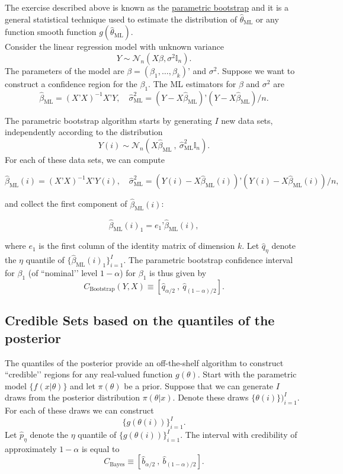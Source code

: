 \documentclass[11pt]{article} %
\begin{document}
The exercise described above is known as the \underline{parametric bootstrap} and it is a general statistical technique used to estimate the distribution of $\widehat{\theta}_{\textrm{ML}}$ or any function smooth function $g(\widehat{\theta}_{\textrm{ML}})$. \\

 Consider the linear regression model with unknown variance
\[ Y \sim \mathcal{N}_n (X\beta, \sigma^2 \mathbb{I}_n). \]
The parameters of the model are $\beta = (\beta_1, \ldots, \beta_{k})’$ and $\sigma^2$. Suppose we want to construct a confidence region for the $\beta_1$. The ML estimators for $\beta$ and $\sigma^2$ are
\[ \widehat{\beta}_{\textrm{ML}} = (X’X)^{-1}X’Y, \quad \widehat{\sigma}^2_{\textrm{ML}} = (Y-X \widehat{\beta}_{\textrm{ML}})’ (Y-X \widehat{\beta}_{\textrm{ML}})/n.  \]

\noindent The parametric bootstrap algorithm starts by generating $I$ new data sets, independently according to the distribution
\[ Y(i)  \sim \mathcal{N}_{n}( X \widehat{\beta}_{\textrm{ML}}\:, \: \widehat{\sigma}^2_{\textrm{ML}} \mathbb{I}_n).   \]
\noindent For each of these data sets, we can compute 

\[ \widehat{\beta}_{\textrm{ML}}(i) = (X’X)^{-1}X’Y(i), \quad \widehat{\sigma}^2_{\textrm{ML}} = (Y(i)-X \widehat{\beta}_{\textrm{ML}}(i))’ (Y(i)-X \widehat{\beta}_{\textrm{ML}}(i))/n,  \]

\noindent and collect the first component of $ \widehat{\beta}_{\textrm{ML}}(i)$:

\[  \widehat{\beta}_{\textrm{ML}}(i)_1 = e_1’ \widehat{\beta}_{\textrm{ML}}(i), \]

\noindent where $e_1$ is the first column of the identity matrix of dimension $k$. Let $\widehat{q}_{\eta}$ denote the $\eta$ quantile of $\{ \widehat{\beta}_{\textrm{ML}}(i)_1\}_{i=1}^{I}$. The parametric bootstrap confidence interval for $\beta_1$ (of ``nominal’’ level $1-\alpha$) for $\beta_1$ is thus given by
\[ C_{\textrm{Bootstrap}}(Y,X) \equiv [ \widehat{q}_{\alpha/2} \:, \: \widehat{q}_{(1-\alpha)/2} ]. \] 

\subsection{Credible Sets based on the quantiles of the posterior}
The quantiles of the posterior provide an off-the-shelf algorithm to construct ``credible’’ regions for any real-valued function $g(\theta)$. Start with the parametric model $\{f(x|\theta)\}$ and let $\pi(\theta)$ be a prior. Suppose that we can generate $I$ draws from the posterior distribution $\pi(\theta | x)$. Denote these draws $\{ \theta(i) \})_{i=1}^{I}$. For each of these draws we can construct
\[ \Big\{ g(\theta(i)) \Big\}_{i=1}^{I}. \]
Let $\widehat{p}_{\eta}$ denote the $\eta$ quantile of $\{ g(\theta(i))\}_{i=1}^{I}$. The interval with credibility of approximately $1-\alpha$ is equal to
\[ C_{\textrm{Bayes}} \equiv [ \widehat{b}_{\alpha/2} \:, \: \widehat{b}_{(1-\alpha)/2} ]. \] 
\end{document}
